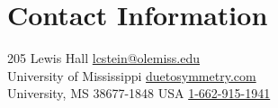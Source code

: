 \section{Contact Information}
205 Lewis Hall      \hfill \href{mailto:lcstein@olemiss.edu}{lcstein@olemiss.edu}\\
University of Mississippi   \hfill \href{https://duetosymmetry.com/}{duetosymmetry.com}\\
University, MS 38677-1848 USA \hfill \href{tel:1-662-915-1941}{1-662-915-1941}


